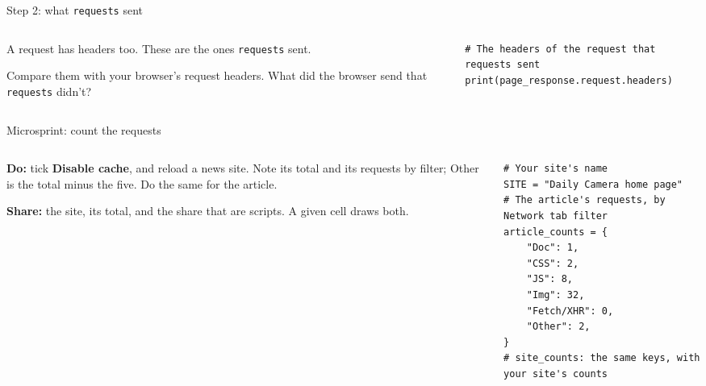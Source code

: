 \documentclass[9pt,aspectratio=169]{beamer}
\begin{document}
\begin{frame}[fragile]{Step 2: what \texttt{requests} sent}
    \begin{columns}[T]
        \begin{column}{0.37\textwidth}
            A request has headers too. These are the ones \texttt{requests} sent.

            \medskip
            Compare them with your browser's request headers. What did the browser send that \texttt{requests} didn't?
        \end{column}
        \begin{column}{0.6\textwidth}
\begin{lstlisting}[style=lab]
# The headers of the request that requests sent
print(page_response.request.headers)
\end{lstlisting}
        \end{column}
    \end{columns}
\end{frame}

\begin{frame}[fragile]{Microsprint: count the requests}
    \begin{columns}[T]
        \begin{column}{0.37\textwidth}
            \textbf{Do:} tick \textbf{Disable cache}, and reload a news site. Note its total and its requests by filter; Other is the total minus the five. Do the same for the article.

            \medskip
            \textbf{Share:} the site, its total, and the share that are scripts. A given cell draws both.
        \end{column}
        \begin{column}{0.6\textwidth}
\begin{lstlisting}[style=lab]
# Your site's name
SITE = "Daily Camera home page"
# The article's requests, by Network tab filter
article_counts = {
    "Doc": 1,
    "CSS": 2,
    "JS": 8,
    "Img": 32,
    "Fetch/XHR": 0,
    "Other": 2,
}
# site_counts: the same keys, with your site's counts
\end{lstlisting}
        \end{column}
    \end{columns}
\end{frame}
\end{document}
